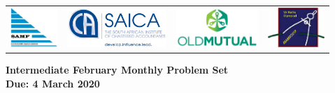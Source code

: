 \documentclass{article}
\begin{document}
 \thispagestyle{empty}

\setlength{\tabcolsep}{5pt}
\begin{center} \begin{tabular}{cccc}
	\includegraphics[height=43pt]{SAMF_logo.jpg} &
	\includegraphics[height=43pt]{SAICA_logo.jpg} &
	\includegraphics[height=43pt]{OM_Logo_Stacked_Vignette_on_White_RGB.jpg} &
	\includegraphics[height=43pt]{SAMO2019.png}
\end{tabular} \end{center}


\bigskip


\begin{center}
\textbf{\Large Intermediate February Monthly Problem Set}
\\ \vspace{1em}
\textbf{\large Due: 4 March 2020}
\end{center}
\end{document}
